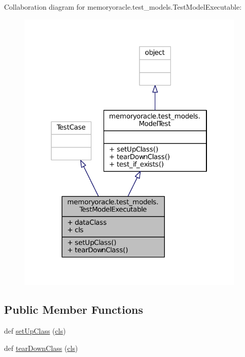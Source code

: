 Collaboration diagram for memoryoracle.\+test\+\_\+models.\+Test\+Model\+Executable\+:\nopagebreak
\begin{figure}[H]
\begin{center}
\leavevmode
\includegraphics[width=310pt]{classmemoryoracle_1_1test__models_1_1TestModelExecutable__coll__graph}
\end{center}
\end{figure}
\subsection*{Public Member Functions}
\begin{DoxyCompactItemize}
\item 
def \hyperlink{classmemoryoracle_1_1test__models_1_1TestModelExecutable_a00d4668810765413dfd43f839b306fcc}{set\+Up\+Class} (\hyperlink{classmemoryoracle_1_1test__models_1_1TestModelExecutable_ae4679f6b3fb16ce418850b4187f1c1de}{cls})
\item 
def \hyperlink{classmemoryoracle_1_1test__models_1_1TestModelExecutable_abcb210f34c56fad978f90d8354d1194a}{tear\+Down\+Class} (\hyperlink{classmemoryoracle_1_1test__models_1_1TestModelExecutable_ae4679f6b3fb16ce418850b4187f1c1de}{cls})
\end{DoxyCompactItemize}
